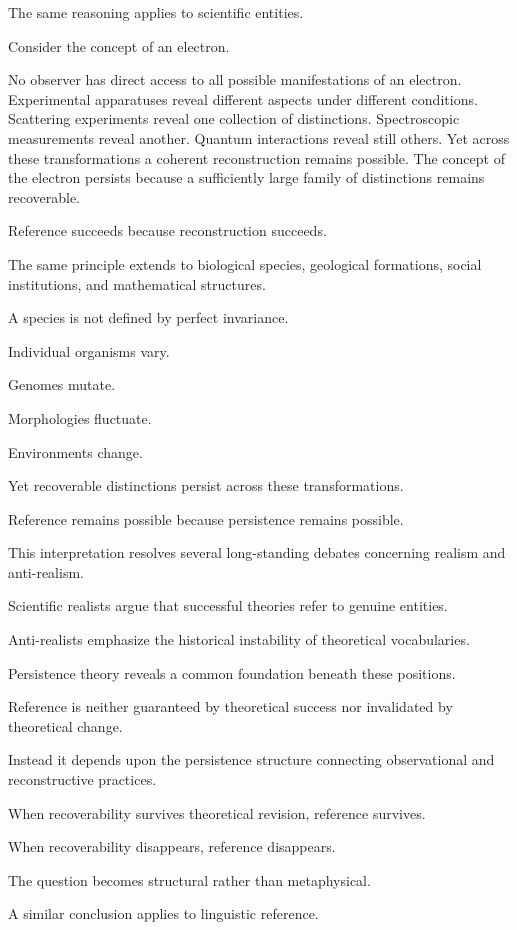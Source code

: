\documentclass[12pt,oneside]{article}
\theoremstyle{definition}
\begin{document}
The same reasoning applies to scientific entities.

Consider the concept of an electron.

No observer has direct access to all possible manifestations of an electron. Experimental apparatuses reveal different aspects under different conditions. Scattering experiments reveal one collection of distinctions. Spectroscopic measurements reveal another. Quantum interactions reveal still others. Yet across these transformations a coherent reconstruction remains possible. The concept of the electron persists because a sufficiently large family of distinctions remains recoverable.

Reference succeeds because reconstruction succeeds.

The same principle extends to biological species, geological formations, social institutions, and mathematical structures.

A species is not defined by perfect invariance.

Individual organisms vary.

Genomes mutate.

Morphologies fluctuate.

Environments change.

Yet recoverable distinctions persist across these transformations.

Reference remains possible because persistence remains possible.

This interpretation resolves several long-standing debates concerning realism and anti-realism.

Scientific realists argue that successful theories refer to genuine entities.

Anti-realists emphasize the historical instability of theoretical vocabularies.

Persistence theory reveals a common foundation beneath these positions.

Reference is neither guaranteed by theoretical success nor invalidated by theoretical change.

Instead it depends upon the persistence structure connecting observational and reconstructive practices.

When recoverability survives theoretical revision, reference survives.

When recoverability disappears, reference disappears.

The question becomes structural rather than metaphysical.

A similar conclusion applies to linguistic reference.
\end{document}
